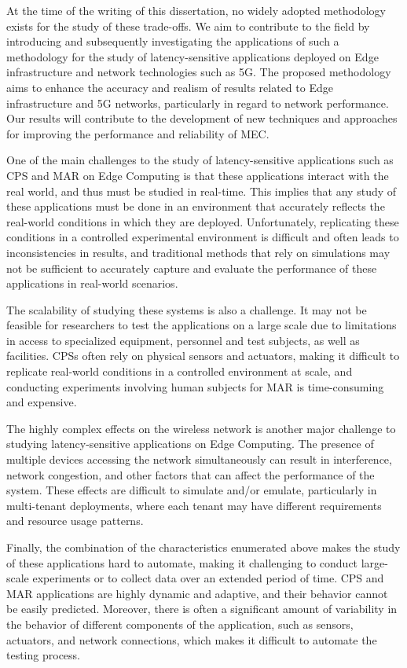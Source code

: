 At the time of the writing of this dissertation, no widely adopted methodology exists for the study of these trade-offs.
We aim to contribute to the field by introducing and subsequently investigating the applications of such a methodology for the study of latency-sensitive applications deployed on Edge infrastructure and network technologies such as 5G.
The proposed methodology aims to enhance the accuracy and realism of results related to Edge infrastructure and 5G networks, particularly in regard to network performance.
Our results will contribute to the development of new techniques and approaches for improving the performance and reliability of \gls{MEC}.

One of the main challenges to the study of latency-sensitive applications such as \gls{CPS} and \gls{MAR} on Edge Computing is that these applications interact with the real world, and thus must be studied in real-time.
This implies that any study of these applications must be done in an environment that accurately reflects the real-world conditions in which they are deployed.
Unfortunately, replicating these conditions in a controlled experimental environment is difficult and often leads to inconsistencies in results, and traditional methods that rely on simulations may not be sufficient to accurately capture and evaluate the performance of these applications in real-world scenarios.

The scalability of studying these systems is also a challenge.
It may not be feasible for researchers to test the applications on a large scale due to limitations in access to specialized equipment, personnel and test subjects, as well as facilities.
\glspl{CPS} often rely on physical sensors and actuators, making it difficult to replicate real-world conditions in a controlled environment at scale, and conducting experiments involving human subjects for \gls{MAR} is time-consuming and expensive.

The highly complex effects on the wireless network is another major challenge to studying latency-sensitive applications on Edge Computing.
The presence of multiple devices accessing the network simultaneously can result in interference, network congestion, and other factors that can affect the performance of the system.
These effects are difficult to simulate and/or emulate, particularly in multi-tenant deployments, where each tenant may have different requirements and resource usage patterns.

Finally, the combination of the characteristics enumerated above makes the study of these applications hard to automate, making it challenging to conduct large-scale experiments or to collect data over an extended period of time.
\gls{CPS} and \gls{MAR} applications are highly dynamic and adaptive, and their behavior cannot be easily predicted.
Moreover, there is often a significant amount of variability in the behavior of different components of the application, such as sensors, actuators, and network connections, which makes it difficult to automate the testing process.

